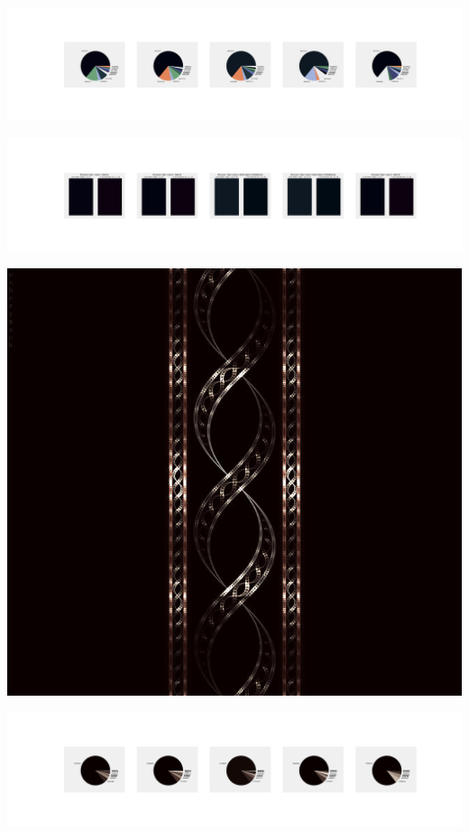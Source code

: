 \documentclass[11pt]{article}
\begin{document}
\begin{landscape}
    \begin{center}
    \includegraphics[width=250mm]{./nbimg/pie-413.jpg}
    \end{center}

    \begin{center}
    \includegraphics[width=250mm]{./nbimg/peak-413.jpg}
    \end{center}
    

    \begin{center}
    \includegraphics[width=\textwidth]{./nbimg/file (66).jpg}
    \end{center}

    \begin{center}
    \includegraphics[width=250mm]{./nbimg/pie-414.jpg}
    \end{center}


\end{landscape}
\end{document}
